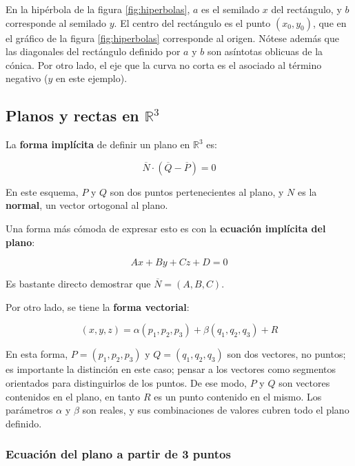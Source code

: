 \documentclass{article}
\renewcommand{\Bbb}{\mathbb}
\begin{document}
En la hipérbola de la figura \ref{fig:hiperbolas}, $a$ es el semilado $x$ del rectángulo, y $b$ corresponde al semilado $y$. El centro del rectángulo es el punto $(x_0, y_0)$, que en el gráfico de la figura \ref{fig:hiperbolas} corresponde al origen. 
Nótese además que las diagonales del rectángulo definido por $a$ y $b$ son asíntotas oblicuas de la cónica. Por otro lado, el eje que la curva no corta es el asociado al término negativo ($y$ en este ejemplo).

\subsection{Planos y rectas en \texorpdfstring{$\Bbb R^3$}{R3}}

La \textbf{forma implícita} de definir un plano en $\Bbb R^3$ es:

\begin{equation}
\overline{N} \cdot (\overline{Q} - \overline{P}) = 0
\end{equation}

En este esquema, $P$ y $Q$ son dos puntos pertenecientes al plano, y $N$ es la \textbf{normal}, un vector ortogonal al plano.

Una forma más cómoda de expresar esto es con la \textbf{ecuación implícita del plano}:

\begin{equation}
A x + B y + C z + D = 0
\end{equation}

Es bastante directo demostrar que $\overline{N} = (A, B, C)$.

Por otro lado, se tiene la \textbf{forma vectorial}:

\begin{equation}
(x,y,z) = \alpha (p_1, p_2, p_3) + \beta (q_1, q_2, q_3) + R
\end{equation}

En esta forma, $P = (p_1, p_2, p_3)$ y $Q = (q_1, q_2, q_3)$ son dos vectores, no puntos; es importante la distinción en este caso; pensar a los vectores como segmentos orientados para distinguirlos de los puntos. De ese modo, $P$ y $Q$ son vectores contenidos en el plano, en tanto $R$ es un punto contenido en el mismo. Los parámetros $\alpha$ y $\beta$ son reales, y sus combinaciones de valores cubren todo el plano definido.

\subsubsection{Ecuación del plano a partir de 3 puntos}
\end{document}
